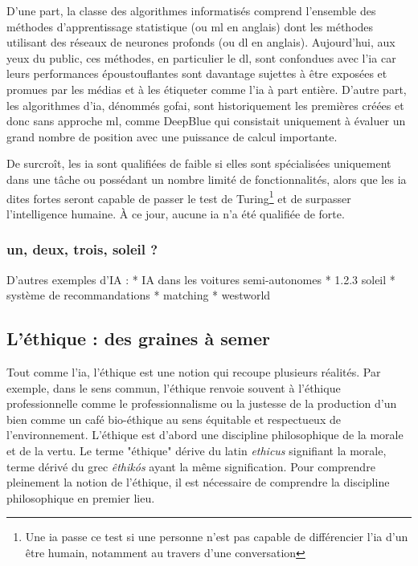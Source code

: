 D'une part, la classe des algorithmes informatisés comprend l'ensemble des méthodes d'apprentissage statistique (ou \gls{ml} en anglais) dont les méthodes utilisant des réseaux de neurones profonds (ou \gls{dl} en anglais). Aujourd'hui, aux yeux du public, ces méthodes, en particulier le \gls{dl}, sont confondues avec l'\gls{ia} car leurs performances époustouflantes sont davantage sujettes à être exposées et promues par les médias et à les étiqueter comme l'\gls{ia} à part entière. D'autre part, les algorithmes d'\gls{ia}, dénommés \gls{gofai}, sont historiquement les premières créées et donc sans approche \gls{ml}, comme DeepBlue qui consistait uniquement à évaluer un grand nombre de position avec une puissance de calcul importante.

De surcroît, les \gls{ia} sont qualifiées de faible si elles sont spécialisées uniquement dans une tâche ou possédant un nombre limité de fonctionnalités, alors que les \gls{ia} dites fortes seront capable de passer le test de Turing\footnote{Une \gls{ia} passe ce test si une personne n'est pas capable de différencier l'\gls{ia} d'un être humain, notamment au travers d'une conversation} et de surpasser l'intelligence humaine. À ce jour, aucune \gls{ia} n'a été qualifiée de forte.

\subsubsection{un, deux, trois, soleil ?}


D'autres exemples d'IA :
* IA dans les voitures semi-autonomes
* 1.2.3 soleil
* système de recommandations
* matching
* westworld




\subsection{L'éthique : des graines à semer}\label{subsection:ethique}

Tout comme l'\gls{ia}, l'éthique est une notion qui recoupe plusieurs réalités. Par exemple, dans le sens commun, l'éthique renvoie souvent à l'éthique professionnelle comme le professionnalisme ou la justesse de la production d'un bien comme un café bio-éthique au sens équitable et respectueux de l'environnement.
L'éthique est d'abord une discipline philosophique de la morale et de la vertu. Le terme "éthique" dérive du latin \textit{ethicus} signifiant la morale, terme dérivé du grec \textit{êthikós} ayant la même signification. Pour comprendre pleinement la notion de l'éthique, il est nécessaire de comprendre la discipline philosophique en premier lieu.

